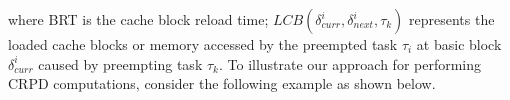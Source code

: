 \noindent where BRT is the cache block reload time; \begin{math}\textit{LCB}(\delta_{curr}^{i},\delta_{next}^{i},\tau_{k})\end{math} represents the loaded cache blocks or memory accessed by the preempted task \begin{math}\tau_{i}\end{math} at basic block \begin{math}\delta_{curr}^{i}\end{math} caused by preempting task \begin{math}\tau_{k}\end{math}.
\newline
\newline
\noindent
To illustrate our approach for performing CRPD computations, consider the following example as shown below.


